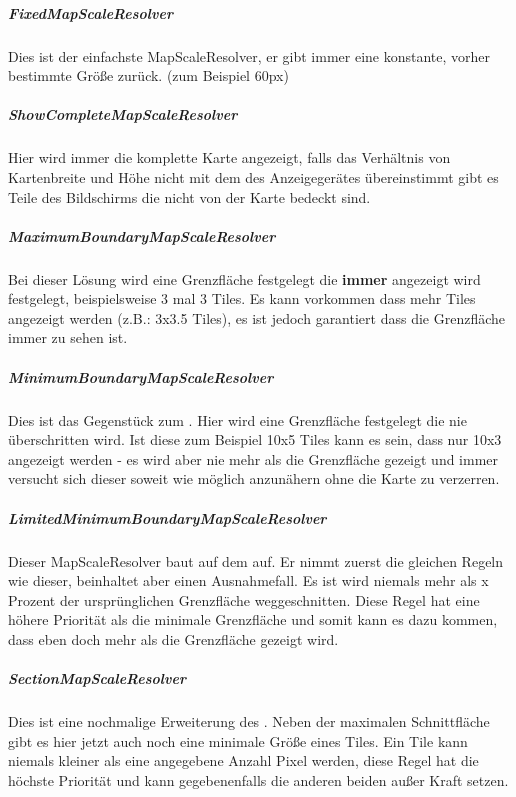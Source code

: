 \subparagraph{FixedMapScaleResolver} 
Dies ist der einfachste MapScaleResolver, er gibt immer eine konstante, vorher bestimmte Größe zurück. (zum Beispiel 60px)

  
\subparagraph{ShowCompleteMapScaleResolver} 
Hier wird immer die komplette Karte angezeigt, falls das Verhältnis von Kartenbreite und Höhe nicht mit dem des Anzeigegerätes übereinstimmt gibt es Teile des Bildschirms die nicht von der Karte bedeckt sind.

  
\subparagraph{MaximumBoundaryMapScaleResolver} 
Bei dieser Lösung wird eine Grenzfläche festgelegt die \textbf{immer} angezeigt wird festgelegt, beispielsweise 3 mal 3 Tiles. 
Es kann vorkommen dass mehr Tiles angezeigt werden (z.B.: 3x3.5 Tiles), es ist jedoch garantiert dass die Grenzfläche immer zu sehen ist.

  
\subparagraph{MinimumBoundaryMapScaleResolver} 
Dies ist das Gegenstück zum . 
Hier wird eine Grenzfläche festgelegt die nie überschritten wird. 
Ist diese zum Beispiel 10x5 Tiles kann es sein, dass nur 10x3 angezeigt werden - es wird aber nie mehr als die Grenzfläche gezeigt und immer versucht sich dieser soweit wie möglich anzunähern ohne die Karte zu verzerren.

  
\subparagraph{LimitedMinimumBoundaryMapScaleResolver} 
Dieser MapScaleResolver baut auf dem  auf. 
Er nimmt zuerst die gleichen Regeln wie dieser, beinhaltet aber einen Ausnahmefall. 
Es ist wird niemals mehr als x Prozent der ursprünglichen Grenzfläche weggeschnitten. 
Diese Regel hat eine höhere Priorität als die minimale Grenzfläche und somit kann es dazu kommen, dass eben doch mehr als die Grenzfläche gezeigt wird.

  
\subparagraph{SectionMapScaleResolver} 
Dies ist eine nochmalige Erweiterung des . 
Neben der maximalen Schnittfläche gibt es hier jetzt auch noch eine minimale Größe eines Tiles. 
Ein Tile kann niemals kleiner als eine angegebene Anzahl Pixel werden, diese Regel hat die höchste Priorität und kann gegebenenfalls die anderen beiden außer Kraft setzen.

